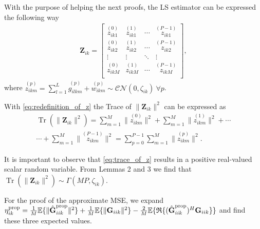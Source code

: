 \documentclass[10pt,journal,comsoc,final]{IEEEtran}
\DeclareMathOperator{\Tr}{Tr}
\begin{document}
With the purpose of helping the next proofs, the LS estimator can be expressed the following way
\begin{equation}\label{eq:redefinition_of_z}
\begin{split}
\textbf{Z}_{ik} = \left[\begin{array}{cccc}
\overset{(0)}{{z}_{ik1}} & \overset{(1)}{{z}_{ik1}} & \cdots & \overset{(P-1)}{{z}_{ik1}} \\
\overset{(0)}{{z}_{ik2}} & \overset{(1)}{{z}_{ik2}} & \cdots & \overset{(P-1)}{{z}_{ik2}} \\
\vdots & \vdots & \ddots & \vdots \\
\overset{(0)}{{z}_{ikM}} & \overset{(1)}{{z}_{ikM}} & \cdots & \overset{(P-1)}{{z}_{ikM}} \\ \end{array} \right],
\end{split}
\end{equation}
where $\overset{(p)}{{z}_{ikm}} = \sum_{l=1}^{L} \overset{(p)}{g_{ilkm}} +  \overset{(p)}{w_{ikm}} \sim \mathcal{CN}(0,\zeta_{ik}) \ \forall p$.

With \eqref{eq:redefinition_of_z} the Trace of $\lVert \textbf{Z}_{ik} \rVert^{2}$ can be expressed as
\begin{equation}\label{eq:trace_of_z}
\begin{split}
\Tr ( \lVert \textbf{Z}_{ik} \rVert^{2} ) = \sum_{m=1}^{M} \lVert \overset{(0)}{{z}_{ikm}} \rVert^{2} + \sum_{m=1}^{M} \lVert \overset{(1)}{{z}_{ikm}} \rVert^{2} + \cdots \\ \cdots + \sum_{m=1}^{M} \lVert \overset{(P-1)}{{z}_{ikm}} \rVert^{2} = \sum_{p=0}^{P-1} \sum_{m=1}^{M} \lVert \overset{(p)}{{z}_{ikm}} \rVert^{2}.
\end{split}
\end{equation}

It is important to observe that \eqref{eq:trace_of_z} results in a positive real-valued scalar random variable. From Lemmas 2 and 3 we find that $\Tr ( \lVert \textbf{Z}_{ik} \rVert^{2} ) \sim \Gamma(MP,\zeta_{ik})$.

For the proof of the approximate MSE, we expand $\eta_{ik}^{\text{\text{prop}}} = \frac{1}{M}\mathbb{E}\{ \lVert \hat{\textbf{G}}_{iik}^{\text{prop}} \rVert^{2} \} + \frac{1}{M}\mathbb{E}\{ \lVert \textbf{G}_{iik} \rVert^{2} \} - \frac{2}{M}\mathbb{E} \{\mathfrak{R}\{ (\hat{\textbf{G}}_{iik}^{\text{prop}})^{H} \textbf{G}_{iik} \}\}$ and find these three expected values.
\end{document}

